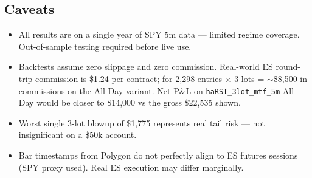 \documentclass[11pt]{article}
\begin{document}
\subsection{Caveats}
\begin{itemize}
\item All results are on a single year of SPY 5m data --- limited regime coverage. Out-of-sample testing required before live use.
\item Backtests assume zero slippage and zero commission. Real-world ES round-trip commission is \$1.24 per contract; for 2{,}298 entries $\times$ 3 lots = $\sim$\$8{,}500 in commissions on the All-Day variant. Net P\&L on \texttt{haRSI\_3lot\_mtf\_5m} All-Day would be closer to \$14{,}000 vs the gross \$22{,}535 shown.
\item Worst single 3-lot blowup of \$1{,}775 represents real tail risk --- not insignificant on a \$50k account.
\item Bar timestamps from Polygon do not perfectly align to ES futures sessions (SPY proxy used). Real ES execution may differ marginally.
\end{itemize}
\end{document}
